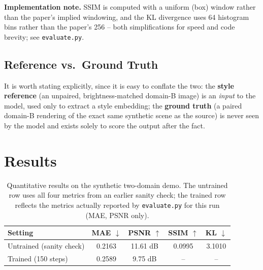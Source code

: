\documentclass[11pt]{article}
\begin{document}
\textbf{Implementation note.} SSIM is computed with a uniform (box)
window rather than the paper's implied windowing, and the KL divergence
uses 64 histogram bins rather than the paper's 256 -- both simplifications
for speed and code brevity; see \texttt{evaluate.py}.

\subsection{Reference vs.\ Ground Truth}
It is worth stating explicitly, since it is easy to conflate the two:
the \textbf{style reference} (an unpaired, brightness-matched domain-B
image) is an \emph{input} to the model, used only to extract a style
embedding; the \textbf{ground truth} (a paired domain-B rendering of the
exact same synthetic scene as the source) is never seen by the model and
exists solely to score the output after the fact.

\section{Results}

\begin{table}[h]
\centering
\caption{Quantitative results on the synthetic two-domain demo. The
         untrained row uses all four metrics from an earlier sanity
         check; the trained row reflects the metrics actually reported
         by \texttt{evaluate.py} for this run (MAE, PSNR only).}
\label{tab:results}
\begin{tabular}{lcccc}
\hline
Setting & MAE $\downarrow$ & PSNR $\uparrow$ & SSIM $\uparrow$ & KL $\downarrow$ \\
\hline
Untrained (sanity check) & 0.2163 & 11.61 dB & 0.0995 & 3.1010 \\
Trained (150 steps)      & 0.2589 & 9.75 dB  & --     & --     \\
\hline
\end{tabular}
\end{table}
\end{document}
